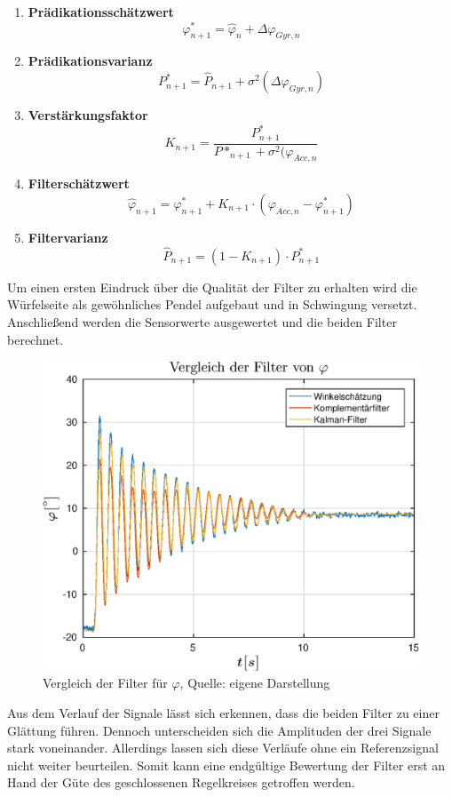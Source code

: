 \begin{enumerate}
\item \textbf{Prädikationsschätzwert}
\begin{equation}
\varphi^*_{n+1} = \hat{\varphi}_n + \Delta \varphi_{Gyr,n}
\end{equation}
\item \textbf{Prädikationsvarianz}
\begin{equation}
P^*_{n+1} = \hat{P}_{n+1} + \sigma^2(\Delta \varphi_{Gyr,n})
\end{equation}
\item \textbf{Verstärkungsfaktor}
\begin{equation}
K_{n+1} = \frac{P^*_{n+1}}{P*_{n+1} + \sigma^2(\varphi_{Acc,n}}
\end{equation}
\item \textbf{Filterschätzwert}
\begin{equation}
\hat{\varphi}_{n+1} = \varphi^*_{n+1} + K_{n+1} \cdot (\varphi_{Acc,n} - \varphi^*_{n+1})
\end{equation}
\item \textbf{Filtervarianz}
\begin{equation}
\hat{P}_{n+1} = (1-K_{n+1}) \cdot P^*_{n+1}
\end{equation}
\end{enumerate}

Um einen ersten Eindruck über die Qualität der Filter zu erhalten wird die Würfelseite als gewöhnliches Pendel aufgebaut und in Schwingung versetzt. Anschließend werden die Sensorwerte ausgewertet und die beiden Filter berechnet. 

\begin{figure}[h!]
\centering
\includegraphics[width=0.5\linewidth]{img/filtervergleich_phi}
\caption{Vergleich der Filter für $\varphi$, Quelle: eigene Darstellung}
\end{figure}

Aus dem Verlauf der Signale lässt sich erkennen, dass die beiden Filter zu einer Glättung führen. Dennoch unterscheiden sich die Amplituden der drei Signale stark voneinander. Allerdings lassen sich diese Verläufe ohne ein Referenzsignal nicht weiter beurteilen. Somit kann eine endgültige Bewertung der Filter erst an Hand der Güte des geschlossenen Regelkreises getroffen werden.

